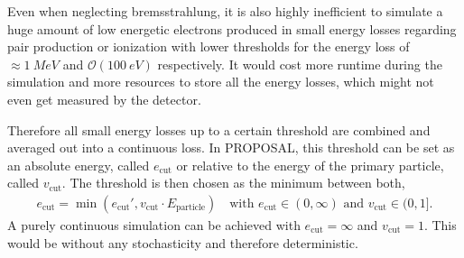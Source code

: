 Even when neglecting bremsstrahlung, it is also highly inefficient to simulate a huge amount of low energetic electrons produced in small energy losses regarding pair production or ionization with lower thresholds for the energy loss of $\approx\SI{1}{MeV}$ and $\mathcal{O}(\SI{100}{eV})$ respectively.
It would cost more runtime during the simulation and more resources to store all the energy losses, which might not even get measured by the detector.

Therefore all small energy losses up to a certain threshold are combined and averaged out into a continuous loss.
In PROPOSAL, this threshold can be set as an absolute energy, called $e_{\textrm{cut}}$ or relative to the energy of the primary particle, called $v_{\textrm{cut}}$.
The threshold is then chosen as the minimum between both,
\begin{align} \label{eq:ecut}
    e_{\textrm{cut}} = \min(e_{\textrm{cut}}', v_{\textrm{cut}} \cdot E_{\mathrm{particle}})
    \quad
    \text{with }
    e_{\textrm{cut}} \in (0, \infty)
    \text{ and }
    v_{\textrm{cut}} \in (0, 1] .
\end{align}
A purely continuous simulation can be achieved with $e_{\textrm{cut}}=\infty$ and $v_{\textrm{cut}}=1$.
This would be without any stochasticity and therefore deterministic.

